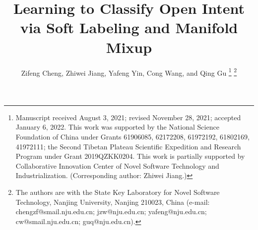 \documentclass[journal]{IEEEtran}
\begin{document}
%
\title{Learning to Classify Open Intent via Soft Labeling and Manifold Mixup}
%
%
%

\author{Zifeng Cheng, Zhiwei Jiang, Yafeng Yin, Cong Wang, and Qing Gu%
\thanks{Manuscript received August 3, 2021; revised November 28, 2021; accepted January 6, 2022.
This work was supported by the National Science Foundation of China under Grants 61906085, 62172208, 61972192, 61802169, 41972111;
the Second Tibetan Plateau Scientific Expedition and Research Program under Grant 2019QZKK0204.
This work is partially supported by Collaborative Innovation Center of Novel Software Technology and Industrialization. (Corresponding author: Zhiwei Jiang.)}%
\thanks{The authors are with the State Key Laboratory for Novel Software Technology, Nanjing University, Nanjing 210023, China (e-mail: chengzf@smail.nju.edu.cn; jzw@nju.edu.cn; yafeng@nju.edu.cn; cw@smail.nju.edu.cn; guq@nju.edu.cn).}%
}

% 
%
\end{document}
